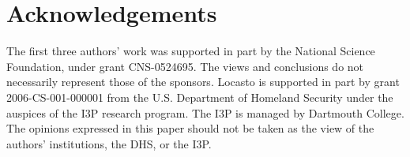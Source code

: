 \section*{Acknowledgements}

{\small 
The first three authors' work was supported in part by the National
Science Foundation, under grant CNS-0524695.  The views and
conclusions do not necessarily represent those of the sponsors.
%
Locasto is supported in part by grant
2006-CS-001-000001 from the U.S. Department of Homeland Security under
the auspices of the I3P research program. The I3P is managed by
Dartmouth College. The opinions expressed in this paper should not be
taken as the view of the authors' institutions, the DHS, or the I3P.
}

